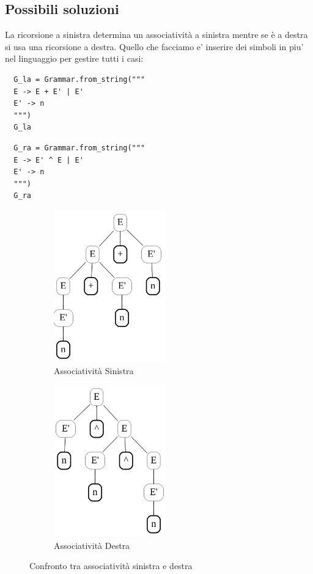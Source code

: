 \subsection{Possibili soluzioni}
La ricorsione a sinistra determina un associatività a sinistra mentre se è a destra si usa una ricorsione a destra. Quello che facciamo e' inserire dei simboli in piu' nel linguaggio per gestire tutti i casi:

\begin{lstlisting}
  G_la = Grammar.from_string("""
  E -> E + E' | E'
  E' -> n 
  """)
  G_la
\end{lstlisting}
\begin{lstlisting}
  G_ra = Grammar.from_string("""
  E -> E' ^ E | E'
  E' -> n 
  """)
  G_ra
\end{lstlisting}
\newpage

\begin{figure}[ht!]
  \centering
  \begin{subfigure}{0.45\textwidth}
      \centering
      \includegraphics[scale=1]{images/AlberiParsing/associativitaSinistra.png}
      \caption{Associatività Sinistra}
  \end{subfigure}
  \hfill
  \begin{subfigure}{0.45\textwidth}
      \centering
      \includegraphics[scale=1]{images/AlberiParsing/associativitiaDestra.png}
      \caption{Associatività Destra}
  \end{subfigure}
  \caption{Confronto tra associatività sinistra e destra}
\end{figure}
 
